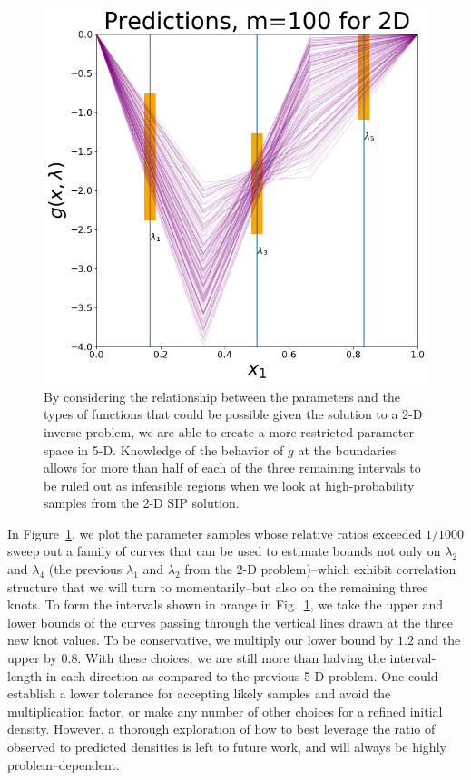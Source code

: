 \begin{figure}[htbp]
\centering
  \includegraphics[width=0.675\linewidth]{figures/pde-highd/pde-highd-alt_initial_D5_m100.png}
\caption{
By considering the relationship between the parameters and the types of functions that could be possible given the solution to a 2-D inverse problem, we are able to create a more restricted parameter space in 5-D.
Knowledge of the behavior of $g$ at the boundaries allows for more than half of each of the three remaining intervals to be ruled out as infeasible regions when we look at high-probability samples from the 2-D SIP solution.
}
\label{fig:pde-highd-5d-study}
\end{figure}

In Figure~\ref{fig:pde-highd-5d-study}, we plot the parameter samples whose relative ratios exceeded $1/1000$ sweep out a family of curves that can be used to estimate bounds not only on $\lambda_2$ and $\lambda_4$ (the previous $\lambda_1$ and $\lambda_2$ from the 2-D problem)\---which exhibit correlation structure that we will turn to momentarily\---but also on the remaining three knots.
To form the intervals shown in orange in Fig.~\ref{fig:pde-highd-5d-study}, we take the upper and lower bounds of the curves passing through the vertical lines drawn at the three new knot values.
To be conservative, we multiply our lower bound by $1.2$ and the upper by $0.8$.
With these choices, we are still more than halving the interval-length in each direction as compared to the previous 5-D problem.
One could establish a lower tolerance for accepting likely samples and avoid the multiplication factor, or make any number of other choices for a refined initial density.
However, a thorough exploration of how to best leverage the ratio of observed to predicted densities is left to future work, and will always be highly problem--dependent.


